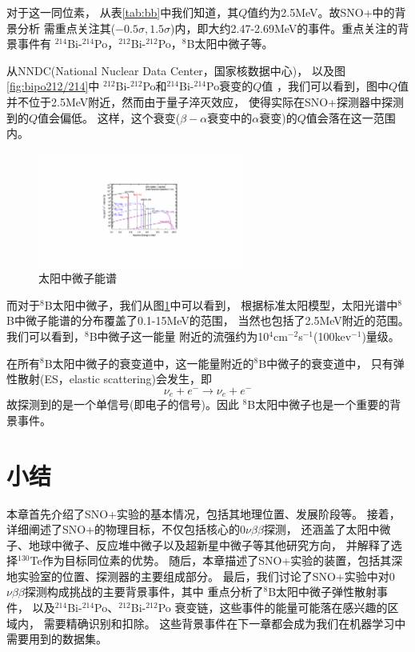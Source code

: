 对于这一同位素，
从表\ref{tab:bb}中我们知道，其$Q$值约为2.5MeV。故SNO+中的背景分析
需重点关注其($-0.5\sigma,1.5\sigma$)内，即大约2.47-2.69MeV的事件。重点关注的背景事件有
${}^{214}$Bi-${}^{214}$Po，${}^{212}$Bi-${}^{212}$Po，${}^{8}$B太阳中微子等。


从NNDC(National Nuclear Data Center，国家核数据中心)，
以及图\ref{fig:bipo212/214}中
${}^{212}$Bi-${}^{212}$Po和${}^{214}$Bi-${}^{214}$Po衰变的$Q$值
，我们可以看到，图中$Q$值并不位于2.5MeV附近，然而由于量子淬灭效应，
使得实际在SNO+探测器中探测到的$Q$值会偏低。\cite{bvkrosigk2015}
这样，这个衰变($\beta-\alpha$衰变中的$\alpha$衰变)的$Q$值会落在这一范围内。

\begin{figure}[htbp]
    \centering
    \includegraphics[width=0.6\textwidth]{figures/solarnuspec.pdf}
    \caption{太阳中微子能谱\cite{ParticleDataGroup:2024cfk}}
    \label{fig:solarnu}
\end{figure}


而对于${}^{8}$B太阳中微子，我们从图\ref{fig:solarnu}中可以看到，
根据标准太阳模型，太阳光谱中${}^{8}$B中微子能谱的分布覆盖了0.1-15MeV的范围，
当然也包括了2.5MeV附近的范围。我们可以看到，${}^{8}$B中微子这一能量
附近的流强约为10${}^4$cm$^{-2}$s$^{-1}$(100kev${}^{-1}$)量级。

在所有${}^8$B太阳中微子的衰变道中，这一能量附近的${}^8$B中微子的衰变道中，
只有弹性散射(ES，elastic scattering)会发生，即
\begin{equation}
    \nu_e + e^- \rightarrow \nu_e + e^-
\end{equation}
故探测到的是一个单信号(即电子的信号)。因此
${}^8$B太阳中微子也是一个重要的背景事件。

\section{小结}\label{summary}

本章首先介绍了SNO+实验的基本情况，包括其地理位置、发展阶段等。
接着，详细阐述了SNO+的物理目标，不仅包括核心的0$\nu\beta\beta$探测，
还涵盖了太阳中微子、地球中微子、反应堆中微子以及超新星中微子等其他研究方向，
并解释了选择${}^{130}$Te作为目标同位素的优势。
随后，本章描述了SNO+实验的装置，包括其深地实验室的位置、探测器的主要组成部分。
最后，我们讨论了SNO+实验中对0$\nu\beta\beta$探测构成挑战的主要背景事件，其中
重点分析了${}^{8}$B太阳中微子弹性散射事件，
以及${}^{214}$Bi-${}^{214}$Po、${}^{212}$Bi-${}^{212}$Po
衰变链，这些事件的能量可能落在感兴趣的区域内，
需要精确识别和扣除。
这些背景事件在下一章都会成为我们在机器学习中需要用到的数据集。